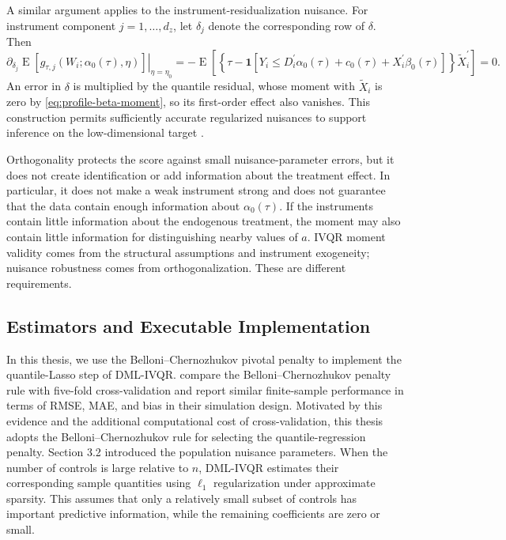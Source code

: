 A similar argument applies to the instrument-residualization nuisance. For instrument component $j=1,\ldots,d_z$, let $\delta_j$ denote the corresponding row of $\delta$. Then
\begin{equation}
    \left.
    \partial_{\delta_j}
    \operatorname{E}\!\left[
        g_{\tau,j}\!\left(W_i;\alpha_0(\tau),\eta\right)
    \right]
    \right|_{\eta=\eta_0}
    =-\operatorname{E}\!\left[
        \left\{
            \tau-\mathbf{1}\!\left[
                Y_i\leq D_i^{\prime}\alpha_0(\tau)
                +c_0(\tau)
                +X_i^{\prime}\beta_0(\tau)
            \right]
        \right\}\widetilde X_i^{\prime}
    \right]
    =0.
    \label{eq:orthogonality-delta}
\end{equation}
An error in $\delta$ is multiplied by the quantile residual, whose moment with $\widetilde X_i$ is zero by \eqref{eq:profile-beta-moment}, so its first-order effect also vanishes. This construction permits sufficiently accurate regularized nuisances to support inference on the low-dimensional target \parencite{chen_huang_tien_2021,chernozhukov_et_al_2018}.

Orthogonality protects the score against small nuisance-parameter errors, but it does not create identification or add information about the treatment effect. In particular, it does not make a weak instrument strong and does not guarantee that the data contain enough information about $\alpha_0(\tau)$. If the instruments contain little information about the endogenous treatment, the moment may also contain little information for distinguishing nearby values of $a$. IVQR moment validity comes from the structural assumptions and instrument exogeneity; nuisance robustness comes from orthogonalization. These are different requirements.

\subsection{Estimators and Executable Implementation}

In this thesis, we use the Belloni--Chernozhukov pivotal penalty to implement the quantile-Lasso step of DML-IVQR. \textcite[Table~3]{chen_huang_tien_2021} compare the Belloni--Chernozhukov penalty rule with five-fold cross-validation and report similar finite-sample performance in terms of RMSE, MAE, and bias in their simulation design. Motivated by this evidence and the additional computational cost of cross-validation, this thesis adopts the Belloni--Chernozhukov rule for selecting the quantile-regression penalty. Section 3.2 introduced the population nuisance parameters. When the number of controls is large relative to \(n\), DML-IVQR estimates their corresponding sample quantities using \(\ell_1\) regularization under approximate sparsity. This assumes that only a relatively small subset of controls has important predictive information, while the remaining coefficients are zero or small.

